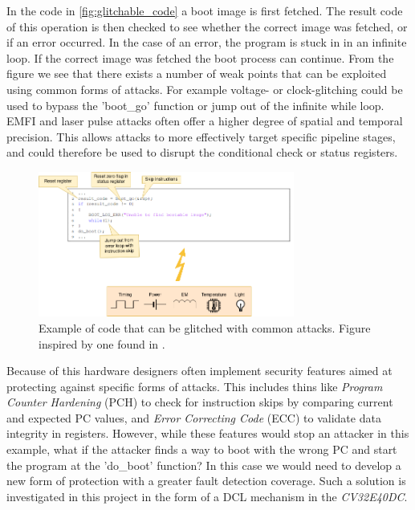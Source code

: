 In the code in \autoref{fig:glitchable_code} a boot image is first fetched. The result code of this operation is then checked to see whether the correct image was fetched, or if an error occurred. In the case of an error, the program is stuck in in an infinite loop. If the correct image was fetched the boot process can continue. From the figure we see that there exists a number of weak points that can be exploited using common forms of attacks. For example voltage- or clock-glitching could be used to bypass the 'boot\_go' function or jump out of the infinite while loop. EMFI and laser pulse attacks often offer a higher degree of spatial and temporal precision. This allows attacks to more effectively target specific pipeline stages, and could therefore be used to disrupt the conditional check or status registers\cite{intro_to_FI}. 

\begin{figure}[h!]
    \centering
    \includegraphics[width=0.75\textwidth]{docs/images/glitch_attack_whole_system.png}
    \caption{Example of code that can be glitched with common attacks. Figure inspired by one found in \cite{arm_presentation}.}
    \label{fig:glitchable_code}
\end{figure}

Because of this hardware designers often implement security features aimed at protecting against specific forms of attacks. This includes thins like \textit{Program Counter Hardening} (PCH) to check for instruction skips by comparing current and expected PC values, and \textit{Error Correcting Code} (ECC) to validate data integrity in registers\cite{cv32e40s_manual}. However, while these features would stop an attacker in this example, what if the attacker finds a way to boot with the wrong PC and start the program at the 'do\_boot' function? In this case we would need to develop a new form of protection with a greater fault detection coverage. Such a solution is investigated in this project in the form of a DCL mechanism in the \textit{CV32E40DC}. 

